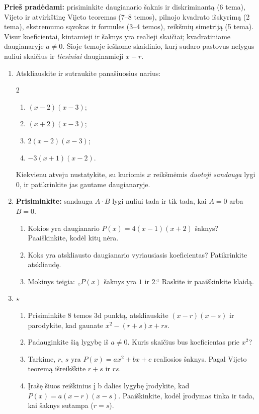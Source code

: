 \documentclass[12pt,a4paper]{article}
\begin{document}
\textbf{Prieš pradėdami:} prisiminkite daugianario šaknis ir diskriminantą (6 tema), Vijeto ir atvirkštinę Vijeto teoremas (7–8 temos), pilnojo kvadrato išskyrimą (2 tema), ekstremumo sąvokas ir formules (3–4 temos), reikšmių simetriją (5 tema). Visur koeficientai, kintamieji ir šaknys yra realieji skaičiai; kvadratiniame daugianaryje $a\ne0$. Šioje temoje ieškome skaidinio, kurį sudaro pastovus nelygus nuliui skaičius ir \emph{tiesiniai} dauginamieji $x-r$.
\begin{enumerate}[series=uzdaviniai]
\item Atskliauskite ir sutraukite panašiuosius narius:
\begin{multicols}{2}\begin{enumerate}
\item $(x-2)(x-3)$; \item $(x+2)(x-3)$; \item $2(x-2)(x-3)$; \item $-3(x+1)(x-2)$.
\end{enumerate}\end{multicols}
Kiekvienu atveju nustatykite, su kuriomis $x$ reikšmėmis \emph{duotoji sandauga} lygi $0$, ir patikrinkite jas gautame daugianaryje.
\item \textbf{Prisiminkite:} sandauga $A\cdot B$ lygi nuliui tada ir tik tada, kai $A=0$ arba $B=0$.
\begin{enumerate}
\item Kokios yra daugianario $P(x)=4(x-1)(x+2)$ šaknys? Paaiškinkite, kodėl kitų nėra.
\item Koks yra atskliausto daugianario vyriausiasis koeficientas? Patikrinkite atskliaudę.
\item Mokinys teigia: „$P(x)$ šaknys yra $1$ ir $2$.“ Raskite ir paaiškinkite klaidą.
\end{enumerate}
\item\label{skaidymo-formule} $\star$ \begin{enumerate}
\item Prisiminkite 8 temos 3d punktą, atskliauskite $(x-r)(x-s)$ ir parodykite, kad gaunate $x^2-(r+s)x+rs$.
\item Padauginkite šią lygybę iš $a\ne0$. Kuris skaičius bus koeficientas prie $x^2$?
\item Tarkime, $r$, $s$ yra $P(x)=ax^2+bx+c$ realiosios šaknys. Pagal Vijeto teoremą išreikškite $r+s$ ir $rs$.
\item Įrašę šiuos reiškinius į b dalies lygybę įrodykite, kad $P(x)=a(x-r)(x-s)$. Paaiškinkite, kodėl įrodymas tinka ir tada, kai šaknys sutampa ($r=s$).

\end{enumerate}
\end{enumerate}
\end{document}
